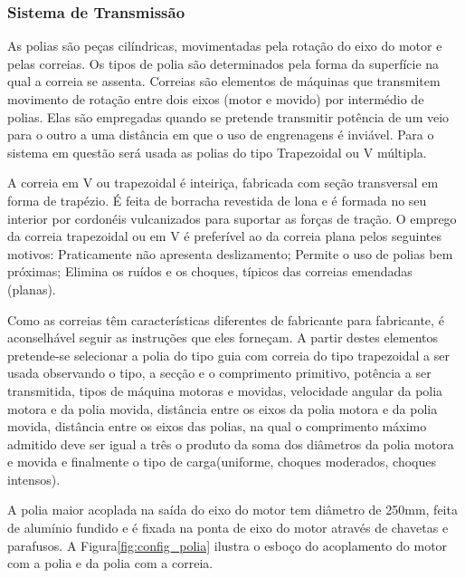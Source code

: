 \subsubsection*{\textbf{Sistema de Transmissão}}


    As polias são peças cilíndricas, movimentadas pela rotação do eixo do motor e pelas correias. Os tipos de polia são determinados pela forma da superfície na qual a correia se assenta. Correias são elementos de máquinas que transmitem movimento de rotação entre dois eixos (motor e movido) por intermédio de polias. Elas são empregadas quando se pretende transmitir potência de um veio para o outro a uma distância em que o uso de engrenagens é inviável. Para o sistema em questão será usada as polias do tipo Trapezoidal ou V múltipla.

    A correia em V ou trapezoidal é inteiriça, fabricada com seção transversal em forma de trapézio. É feita de borracha revestida de lona e é formada no seu interior por cordonéis vulcanizados para suportar as forças de tração. O emprego da correia trapezoidal ou em V é preferível ao da correia plana pelos seguintes motivos: Praticamente não apresenta deslizamento; Permite o uso de polias bem próximas; Elimina os ruídos e os choques, típicos das correias emendadas (planas).

    Como as correias têm características diferentes de fabricante para fabricante, é aconselhável seguir as instruções que eles forneçam. A partir destes elementos pretende-se selecionar a polia do tipo guia com correia do tipo trapezoidal a ser usada observando o tipo, a secção e o comprimento primitivo, potência a ser transmitida, tipos de máquina motoras e movidas, velocidade angular da polia motora e da polia movida, distância entre os eixos da polia motora e da polia movida, distância entre os eixos das polias, na qual o comprimento máximo admitido deve ser igual a três o produto da soma dos diâmetros da polia motora e movida e finalmente o tipo de carga(uniforme, choques moderados, choques intensos).

    A polia maior acoplada na saída do eixo do motor tem diâmetro de 250mm, feita de alumínio fundido e é fixada na ponta de eixo do motor através de chavetas e parafusos. A Figura\ref{fig:config_polia} ilustra o esboço do acoplamento do motor com a polia e da polia com a correia.

